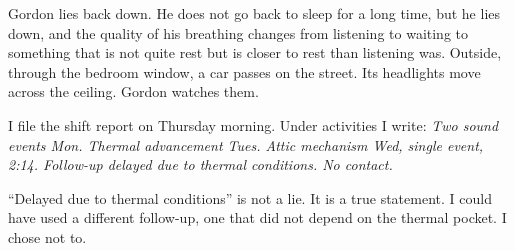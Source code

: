 Gordon lies back down. He does not go back to sleep for a long time, but he lies down, and the quality of his breathing changes from listening to waiting to something that is not quite rest but is closer to rest than listening was. Outside, through the bedroom window, a car passes on the street. Its headlights move across the ceiling. Gordon watches them.

I file the shift report on Thursday morning. Under activities I write: \emph{Two sound events Mon. Thermal advancement Tues. Attic mechanism Wed, single event, 2:14. Follow-up delayed due to thermal conditions. No contact.}

``Delayed due to thermal conditions'' is not a lie. It is a true statement. I could have used a different follow-up, one that did not depend on the thermal pocket. I chose not to.
